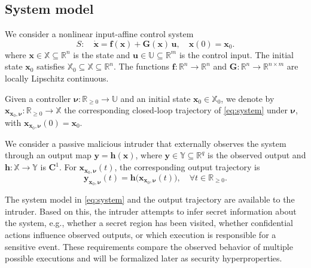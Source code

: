 \documentclass[journal,twoside,web]{ieeecolor}
\begin{document}
\subsection{System model} \label{subsec:system}

We consider a nonlinear input-affine control system
\begin{equation} \label{eq:system}
    S: \quad \dot{\mathbf{x}} = \mathbf{f}(\mathbf{x}) + \mathbf{G}(\mathbf{x}) \, \mathbf{u}, \quad \mathbf{x}(0) = \mathbf{x}_0.
\end{equation}
where $\mathbf{x} \in \mathbb{X} \subseteq \mathbb{R}^n$ is the state and $\mathbf{u} \in \mathbb{U} \subseteq \mathbb{R}^m$ is the control input. The initial state $\mathbf{x}_0$ satisfies $\mathbb{X}_0 \subseteq \mathbb{X} \subseteq \mathbb{R}^n$. The functions $\mathbf{f}: \mathbb{R}^n \rightarrow \mathbb{R}^n$ and $\mathbf{G}: \mathbb{R}^n \rightarrow \mathbb{R}^{n \times m}$ are locally Lipschitz continuous.

Given a controller $\boldsymbol{\nu}: \mathbb{R}_{\ge 0} \to \mathbb{U}$ and an initial state $\mathbf{x}_0 \in \mathbb{X}_0$, we denote by
$\mathbf{x}_{\mathbf{x}_0,\boldsymbol{\nu}}: \mathbb{R}_{\ge 0} \to \mathbb{X}$
the corresponding closed-loop trajectory of \eqref{eq:system} under $\boldsymbol{\nu}$, with $\mathbf{x}_{\mathbf{x}_0,\boldsymbol{\nu}}(0)=\mathbf{x}_0$.

We consider a passive malicious intruder that externally observes the system through an output map
$\mathbf{y} = \mathbf{h}(\mathbf{x})$,
where $\mathbf{y} \in \mathbb{Y} \subseteq \mathbb{R}^q$ is the observed output and $\mathbf{h}: \mathbb{X} \to \mathbb{Y}$ is $\mathbf{C}^1$. For $\mathbf{x}_{\mathbf{x}_0,\boldsymbol{\nu}}(t)$, the corresponding output trajectory is 
\begin{equation} \label{eq:output}
    \mathbf{y}_{\mathbf{x}_0, \boldsymbol{\nu}} (t) = \mathbf{h} \big( \mathbf{x}_{\mathbf{x}_0, \boldsymbol{\nu}} (t) \big), \quad \forall t \in \mathbb{R}_{\ge 0}.
\end{equation}

The system model in \eqref{eq:system} and the output trajectory are available to the intruder. Based on this, the intruder attempts to infer secret information about the system, e.g., whether a secret region has been visited, whether confidential actions influence observed outputs, or which execution is responsible for a sensitive event. These requirements compare the observed behavior of multiple possible executions and will be formalized later as security hyperproperties. 
\end{document}
